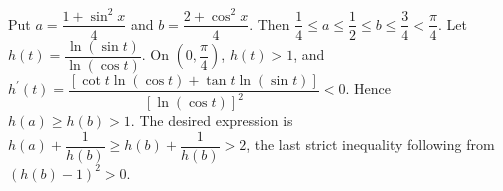 Put $a = \dfrac{1+\sin^2x}{4}$ and $b = \dfrac{2+\cos^2x}{4}$. Then $\dfrac{1}{4} \le a \le \dfrac{1}{2} \le b \le \dfrac{3}{4} < \dfrac{\pi}{4}$. Let $h (t) = \dfrac{\ln (\sin t)}{\ln (\cos t)}$. On $(0 , \dfrac{\pi}{4})$, $h(t)>1$, and $h^{\prime} (t) = \dfrac{[\cot t\ln(\cos t)+\tan t\ln(\sin t)]}{[\ln(\cos t)]^2} < 0$. Hence $h(a)\ge h(b)>1$. The desired expression is $h (a) + \dfrac{1}{h (b)} \ge h (b) + \dfrac{1}{h (b)} > 2$, the last strict inequality following from $(h(b)-1)^2>0$.
